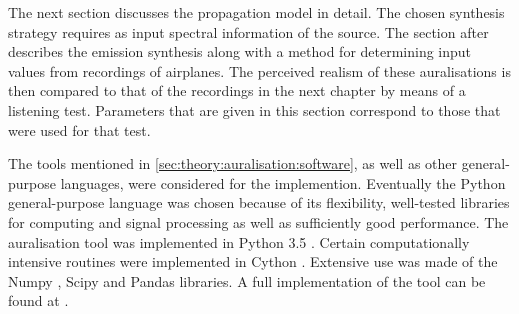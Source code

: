 The next section discusses the propagation model in detail. The chosen synthesis
strategy requires as input spectral information of the source. The section after
describes the emission synthesis along with a method
for determining input values from recordings of airplanes. The perceived realism
of these auralisations is then compared to that of the recordings in the next
chapter by means of a listening test. Parameters that are given in this section
correspond to those that were used for that test.

The tools mentioned in \ref{sec:theory:auralisation:software}, as well as other
general-purpose languages, were considered for the implemention.
Eventually the Python general-purpose language was chosen because of its flexibility,
well-tested libraries for computing and signal processing as well as sufficiently good
performance. The auralisation tool was implemented in Python 3.5 \cite{Python}.
Certain computationally intensive routines were implemented in Cython \cite{Behnel2011,Cython}.
Extensive use was made of the Numpy \cite{VanderWalt2011,Numpy}, Scipy \cite{Scipy} and
Pandas \cite{Mckinney2010} libraries. A full implementation of the tool can be
found at \cite{Rietdijk2017d}.

